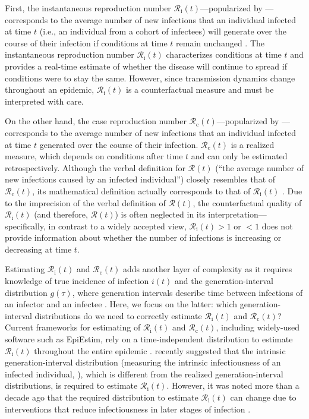 \documentclass[12pt]{article}
\newcommand{\Rx}[1]{\ensuremath{{\mathcal R}_{#1}}\xspace}
\newcommand{\Rc}{\Rx{\mathrm{c}}}
\newcommand{\Ri}{\Rx{\mathrm{i}}}
\newcommand{\RR}{\ensuremath{{\mathcal R}}\xspace}
\begin{document}
First, the instantaneous reproduction number $\Ri(t)$---popularized by \cite{cori2013new}---corresponds to the average number of new infections that an individual infected at time $t$ (i.e., an individual from a cohort of infectees) will generate over the course of their infection if conditions at time $t$ remain unchanged \citep{fraser2007estimating}.
The instantaneous reproduction number $\Ri(t)$ characterizes conditions at time $t$ and provides a real-time estimate of whether the disease will continue to spread if conditions were to stay the same.
However, since transmission dynamics change throughout an epidemic, $\Ri(t)$ is a counterfactual measure and must be interpreted with care.

On the other hand, the case reproduction number $\Rc(t)$---popularized by \cite{wallinga2004different}---corresponds to the average number of new infections that an individual infected at time $t$ generated over the course of their infection.
$\Rc(t)$ is a realized measure, which depends on conditions after time $t$ and can only be estimated retrospectively.
Although the verbal definition for $\RR(t)$ (``the average number of new infections caused by an infected individual'') closely resembles that of $\Rc(t)$, its mathematical definition actually corresponds to that of $\Ri(t)$ \citep{gostic2020practical}.
Due to the imprecision of the verbal definition of $\RR(t)$, the counterfactual quality of $\Ri(t)$ (and therefore, $\RR(t)$) is often neglected in its interpretation---
specifically, in contrast to a widely accepted view, $\Ri(t) > 1$ or $<1$ does not provide information about whether the number of infections is increasing or decreasing at time $t$.

Estimating $\Ri(t)$ and $\Rc(t)$ adds another layer of complexity as it requires knowledge of true incidence of infection $i(t)$ and the generation-interval distribution $g(\tau)$, where generation intervals describe time between infections of an infector and an infectee \citep{svensson2007note}.
Here, we focus on the latter: which generation-interval distributions do we need to correctly estimate $\Ri(t)$ and $\Rc(t)$?
Current frameworks for estimating of $\Ri(t)$ and $\Rc(t)$, including widely-used software such as EpiEstim, rely on a time-independent distribution to estimate $\Ri(t)$ throughout the entire epidemic \citep{cori2013new}.
\cite{gostic2020practical} recently suggested that the intrinsic generation-interval distribution (measuring the intrinsic infectiousness of an infected individual, \cite{champredon2015intrinsic}), which is different from the realized generation-interval distributions, is required to estimate $\Ri(t)$.
However, it was noted more than a decade ago that the required distribution to estimate $\Ri(t)$ can change due to interventions that reduce infectiousness in later stages of infection \citep{fraser2007estimating}.
\end{document}
